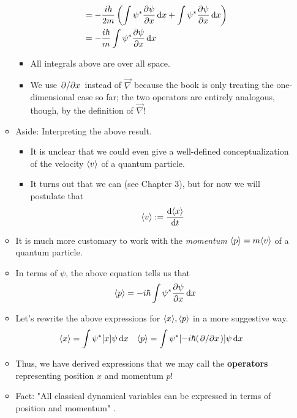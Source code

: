 \documentclass[../notes.tex]{subfiles}
\begin{document}
\begin{itemize}
\begin{itemize}
\begin{align*}
            &= -\frac{i\hbar}{2m}\left( \int\psi^*\pdv{\psi}{x}\dd{x}+\int\psi^*\pdv{\psi}{x}\dd{x}\right)\\
            &= -\frac{i\hbar}{m}\int\psi^*\pdv{\psi}{x}\dd{x}
        \end{align*}
        \begin{itemize}
            \item All integrals above are over all space.
            \item We use $\pdv*{x}$ instead of $\vec{\nabla}$ because the book is only treating the one-dimensional case so far; the two operators are entirely analogous, though, by the definition of $\vec{\nabla}$!
        \end{itemize}
        \item Aside: Interpreting the above result.
        \begin{itemize}
            \item It is unclear that we could even give a well-defined conceptualization of the velocity $\langle{v}\rangle$ of a quantum particle.
            \item It turns out that we can (see Chapter 3), but for now we will postulate that
            \begin{equation*}
                \langle{v}\rangle := \dv{\langle{x}\rangle}{t}
            \end{equation*}
        \end{itemize}
        \item It is much more customary to work with the \emph{momentum} $\langle{p}\rangle=m\langle{v}\rangle$ of a quantum particle.
        \item In terms of $\psi$, the above equation tells us that
        \begin{equation*}
            \langle{p}\rangle = -i\hbar\int\psi^*\pdv{\psi}{x}\dd{x}
        \end{equation*}
        \item Let's rewrite the above expressions for $\langle{x}\rangle,\langle{p}\rangle$ in a more suggestive way.
        \begin{align*}
            \langle{x}\rangle &= \int\psi^*[x]\psi\dd{x}&
            \langle{p}\rangle &= \int\psi^*[-i\hbar(\pdv*{x})]\psi\dd{x}
        \end{align*}
        \item Thus, we have derived expressions that we may call the \textbf{operators} representing position $x$ and momentum $p$!
        \item Fact: "All classical dynamical variables can be expressed in terms of position and momentum" \parencite[33]{bib:Griffiths}.

\end{itemize}
\end{itemize}
\end{document}
